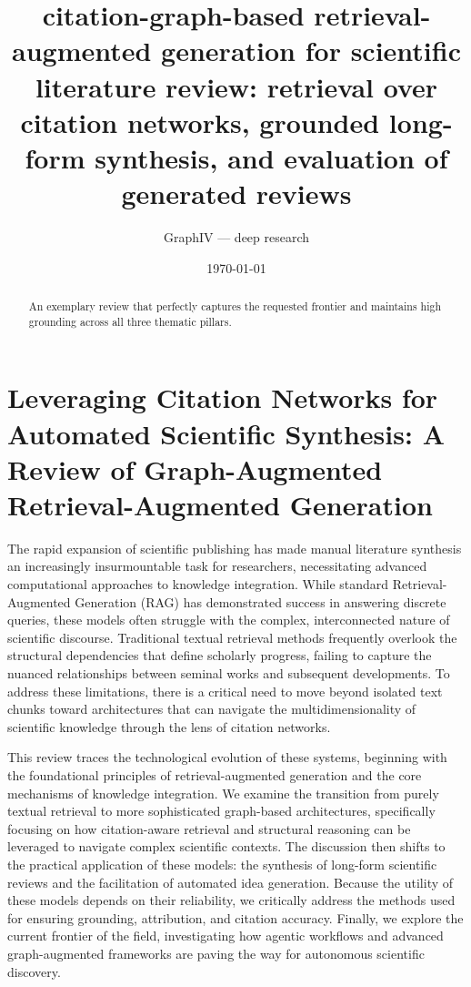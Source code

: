 \documentclass[11pt]{article}
\title{citation-graph-based retrieval-augmented generation for scientific literature review: retrieval over citation networks, grounded long-form synthesis, and evaluation of generated reviews}
\author{GraphIV --- deep research}
\date{\today}
\begin{document}
\maketitle

\begin{abstract}
An exemplary review that perfectly captures the requested frontier and maintains high grounding across all three thematic pillars.
\end{abstract}

\section{Leveraging Citation Networks for Automated Scientific Synthesis: A Review of Graph-Augmented Retrieval-Augmented Generation}

The rapid expansion of scientific publishing has made manual literature synthesis an increasingly insurmountable task for researchers, necessitating advanced computational approaches to knowledge integration. While standard Retrieval-Augmented Generation (RAG) has demonstrated success in answering discrete queries, these models often struggle with the complex, interconnected nature of scientific discourse. Traditional textual retrieval methods frequently overlook the structural dependencies that define scholarly progress, failing to capture the nuanced relationships between seminal works and subsequent developments. To address these limitations, there is a critical need to move beyond isolated text chunks toward architectures that can navigate the multidimensionality of scientific knowledge through the lens of citation networks.

This review traces the technological evolution of these systems, beginning with the foundational principles of retrieval-augmented generation and the core mechanisms of knowledge integration. We examine the transition from purely textual retrieval to more sophisticated graph-based architectures, specifically focusing on how citation-aware retrieval and structural reasoning can be leveraged to navigate complex scientific contexts. The discussion then shifts to the practical application of these models: the synthesis of long-form scientific reviews and the facilitation of automated idea generation. Because the utility of these models depends on their reliability, we critically address the methods used for ensuring grounding, attribution, and citation accuracy. Finally, we explore the current frontier of the field, investigating how agentic workflows and advanced graph-augmented frameworks are paving the way for autonomous scientific discovery.
\end{document}
